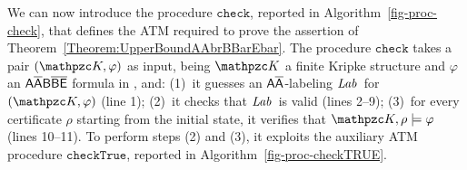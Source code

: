 We can now introduce the procedure $\texttt{check}$, reported in Algorithm~\ref{fig-proc-check}, that defines the ATM required to prove the assertion of Theorem~\ref{Theorem:UpperBoundAAbrBBarEbar}.
The procedure $\texttt{check}$ takes a pair $(\Ku,\varphi)$ as input, being $\Ku$ a finite Kripke structure and $\varphi$ an $\mathsf{A\overline{A}B\overline{B}\overline{E}}$ formula in \nnf, and: (1)~it guesses
  an $\mathsf{A\overline{A}}$-labeling  $\textit{Lab}\,$ for $(\Ku,\varphi)$ (line 1); (2)~it checks that $\textit{Lab}\,$ is valid (lines 2--9); (3)~for every certificate $\rho$ starting from the initial state, it verifies that $\Ku,\rho\models \varphi$ (lines 10--11). To perform steps (2) and (3), it exploits the
  auxiliary ATM procedure $\texttt{checkTrue}$, reported in Algorithm~\ref{fig-proc-checkTRUE}. 
  
\begin{algorithm}[p]
\caption{$\texttt{checkTrue}_{\tpl{\Ku,\varphi,\GLab}}(\WS)$}\label{fig-proc-checkTRUE}
\begin{algorithmic}[1]
%
    \State{$\WS\leftarrow \WS\setminus \{(\psi,\rho)\}$}
        \EndIf
        \EndIf
        \If{$\psi\notin\GLab(\lst(\rho))$}
        \EndIf
        \If{$\psi\notin\GLab(\fst(\rho))$}
        \EndIf
        
        
    \EndCase
\EndWhile
%
\If{$\mathcal{\WS}=\emptyset$}
\Else
\EndIf
\end{algorithmic}
\end{algorithm}  
  

